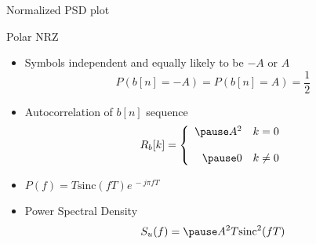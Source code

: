 \documentclass[t]{beamer}
\begin{document}
\begin{frame}{Normalized PSD plot}
  \footnotesize
  \begin{figure}
    \centering
  \end{figure}
  \normalsize
\end{frame}

\begin{frame}{Polar NRZ}
  \footnotesize
  \begin{itemize}
    \item Symbols independent and equally likely to be $-A$ or $A$
      \begin{equation*}
        P\left(b[n] = -A\right) = P\left(b[n]= A\right) = \frac{1}{2}
      \end{equation*}
    \pause
    \item Autocorrelation of $b[n]$ sequence 
      \begin{equation*}
        R_b[k] = \left\{ 
                    \begin{array}{rr}
                      \pause
                       A^2 & k = 0 \\
                          & \\
                      \pause
                       0 & k \neq 0 
                    \end{array}
                 \right.
      \end{equation*}
    \pause 
    \item $P(f) = T\text{sinc}(fT) e^{\ -j\pi fT}$
    \pause
    \item Power Spectral Density
      \begin{equation*}
        S_u(f) = \pause A^2T\text{sinc}^2(fT) 
      \end{equation*}
  \end{itemize}
  \normalsize
\end{frame}
\end{document}
